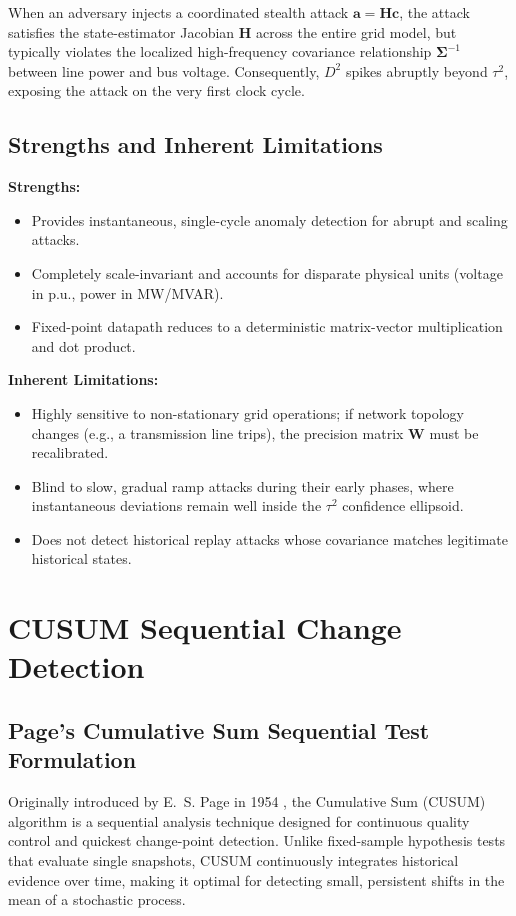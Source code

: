 \documentclass[12pt,a4paper]{report}
\begin{document}
When an adversary injects a coordinated stealth attack $\boldsymbol{a} = \boldsymbol{H}\boldsymbol{c}$,
the attack satisfies the state-estimator Jacobian $\boldsymbol{H}$ across the entire grid
model, but typically violates the localized high-frequency covariance relationship
$\boldsymbol{\Sigma}^{-1}$ between line power and bus voltage. Consequently, $D^2$ spikes
abruptly beyond $\tau^2$, exposing the attack on the very first clock cycle.

\subsection{Strengths and Inherent Limitations}
\textbf{Strengths:}
\begin{itemize}
    \item Provides instantaneous, single-cycle anomaly detection for abrupt and scaling attacks.
    \item Completely scale-invariant and accounts for disparate physical units (voltage in p.u.,
    power in MW/MVAR).
    \item Fixed-point datapath reduces to a deterministic matrix-vector multiplication and dot product.
\end{itemize}

\textbf{Inherent Limitations:}
\begin{itemize}
    \item Highly sensitive to non-stationary grid operations; if network topology changes
    (e.g., a transmission line trips), the precision matrix $\boldsymbol{W}$ must be recalibrated.
    \item Blind to slow, gradual ramp attacks during their early phases, where instantaneous
    deviations remain well inside the $\tau^2$ confidence ellipsoid.
    \item Does not detect historical replay attacks whose covariance matches legitimate historical states.
\end{itemize}

\section{CUSUM Sequential Change Detection}

\subsection{Page's Cumulative Sum Sequential Test Formulation}
Originally introduced by E.~S. Page in 1954 \cite{page1954}, the Cumulative Sum (CUSUM)
algorithm is a sequential analysis technique designed for continuous quality control and
quickest change-point detection. Unlike fixed-sample hypothesis tests that evaluate single
snapshots, CUSUM continuously integrates historical evidence over time, making it optimal
for detecting small, persistent shifts in the mean of a stochastic process.
\end{document}
